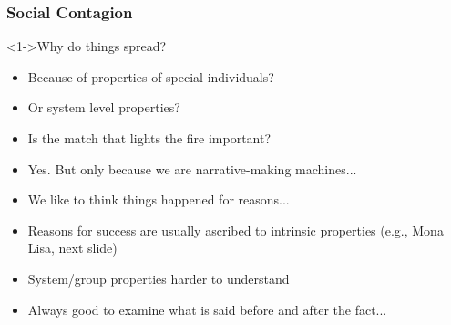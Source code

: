 \begin{frame}
  \frametitle{Social Contagion}

  \begin{block}<1->{Why do things spread?}
    \begin{itemize}
    \item<2-> Because of properties of special individuals?
    \item<3-> Or system level properties?
    \item<4-> Is the match that lights the fire important?
    \item<5-> Yes.  But only because we are narrative-making machines...
    \item<6-> We like to think things happened for reasons...
    \item<7-> Reasons for success are usually ascribed to intrinsic
      properties (e.g., Mona Lisa, next slide)
    \item<8-> System/group properties harder to understand
    \item<9-> Always good to examine what is said before and after the fact...
    \end{itemize}
  \end{block}


\end{frame}

